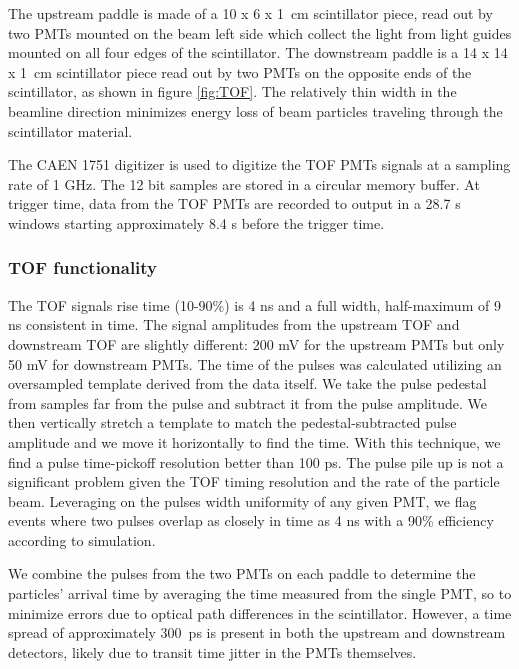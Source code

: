 The upstream paddle is made of a 10 x 6 x 1~cm scintillator piece, read out by two PMTs mounted on the beam left side which collect the light from light guides mounted on all four edges of the scintillator. The downstream paddle is a   14 x 14 x 1~cm scintillator piece read out by two PMTs on the opposite ends of the scintillator, as shown in figure \ref{fig:TOF}.
The relatively thin width in the beamline direction minimizes energy loss of beam particles traveling through the scintillator material.

The CAEN 1751 digitizer is used to digitize the TOF PMTs signals at a sampling rate of 1 GHz. The 12 bit samples are stored in a circular memory buffer. At trigger time, data from the TOF PMTs are recorded to output in a 28.7 \textmu s windows starting  approximately 8.4 \textmu s before the trigger time. 


\subsubsection{TOF functionality}\label{sec:TOFfunc}


The TOF signals rise time (10-90\%) is 4 ns and a full width, half-maximum of 9 ns consistent in time. The signal amplitudes from the upstream TOF and  downstream TOF are slightly different:  200 mV for the upstream PMTs but only 50 mV for downstream PMTs. The time of the pulses was calculated utilizing an oversampled template derived from the data itself. We take the pulse pedestal from samples far from the pulse and subtract it from the pulse amplitude. We then vertically stretch  a template to match the pedestal-subtracted pulse amplitude and we move it horizontally to find the time. With this technique, we find a pulse time-pickoff resolution better than 100 ps.  The pulse pile up is not a significant problem given the TOF timing resolution and the rate of the particle beam.  Leveraging on the pulses width uniformity of any given PMT,  we flag events where two pulses overlap as closely in time as 4 ns with a 90\% efficiency according to simulation. 


We combine the pulses from the two PMTs on each paddle to determine the particles' arrival time by averaging the time measured from the single PMT, so to minimize errors due to optical path differences in the scintillator.  However, a time spread of approximately 300~ps is present in both the upstream and downstream detectors, likely due to transit time jitter in the PMTs themselves.  %

